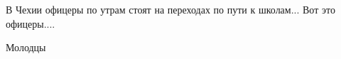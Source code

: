  
 
 
 
 

\qqSecCmt


В Чехии офицеры по утрам стоят на переходах по пути к школам... Вот это офицеры....


Молодцы
